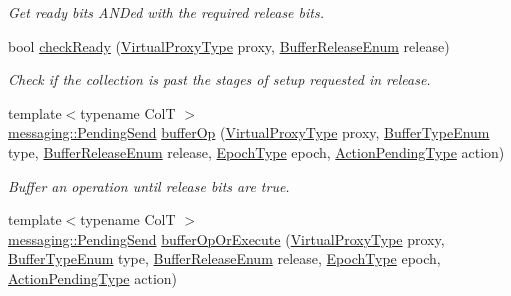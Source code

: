 \begin{DoxyCompactItemize}
\begin{DoxyCompactList}\small\item\em Get ready bits A\+ND\textquotesingle{}ed with the required release bits. \end{DoxyCompactList}\item 
bool \hyperlink{structvt_1_1vrt_1_1collection_1_1_collection_manager_a842ef81ac4f1562b35a27126cfd26159}{check\+Ready} (\hyperlink{namespacevt_a1b417dd5d684f045bb58a0ede70045ac}{Virtual\+Proxy\+Type} proxy, \hyperlink{namespacevt_1_1vrt_1_1collection_a2545006e681bacc1f00be9d5d6bdc8fa}{Buffer\+Release\+Enum} release)
\begin{DoxyCompactList}\small\item\em Check if the collection is past the stages of setup requested in release. \end{DoxyCompactList}\item 
{\footnotesize template$<$typename ColT $>$ }\\\hyperlink{structvt_1_1messaging_1_1_pending_send}{messaging\+::\+Pending\+Send} \hyperlink{structvt_1_1vrt_1_1collection_1_1_collection_manager_ac5ba46c0eac77a81aec0c6119de6778c}{buffer\+Op} (\hyperlink{namespacevt_a1b417dd5d684f045bb58a0ede70045ac}{Virtual\+Proxy\+Type} proxy, \hyperlink{namespacevt_1_1vrt_1_1collection_a1b1b082e2ff4e9e5d1b7227acd78db3f}{Buffer\+Type\+Enum} type, \hyperlink{namespacevt_1_1vrt_1_1collection_a2545006e681bacc1f00be9d5d6bdc8fa}{Buffer\+Release\+Enum} release, \hyperlink{namespacevt_a985a5adf291c34a3ca263b3378388236}{Epoch\+Type} epoch, \hyperlink{structvt_1_1vrt_1_1collection_1_1_collection_manager_a61252b0d805cdb8fdea35439de468001}{Action\+Pending\+Type} action)
\begin{DoxyCompactList}\small\item\em Buffer an operation until release bits are true. \end{DoxyCompactList}\item 
{\footnotesize template$<$typename ColT $>$ }\\\hyperlink{structvt_1_1messaging_1_1_pending_send}{messaging\+::\+Pending\+Send} \hyperlink{structvt_1_1vrt_1_1collection_1_1_collection_manager_a062ee2034ac6bba36a35580b570de23f}{buffer\+Op\+Or\+Execute} (\hyperlink{namespacevt_a1b417dd5d684f045bb58a0ede70045ac}{Virtual\+Proxy\+Type} proxy, \hyperlink{namespacevt_1_1vrt_1_1collection_a1b1b082e2ff4e9e5d1b7227acd78db3f}{Buffer\+Type\+Enum} type, \hyperlink{namespacevt_1_1vrt_1_1collection_a2545006e681bacc1f00be9d5d6bdc8fa}{Buffer\+Release\+Enum} release, \hyperlink{namespacevt_a985a5adf291c34a3ca263b3378388236}{Epoch\+Type} epoch, \hyperlink{structvt_1_1vrt_1_1collection_1_1_collection_manager_a61252b0d805cdb8fdea35439de468001}{Action\+Pending\+Type} action)

\end{DoxyCompactItemize}
